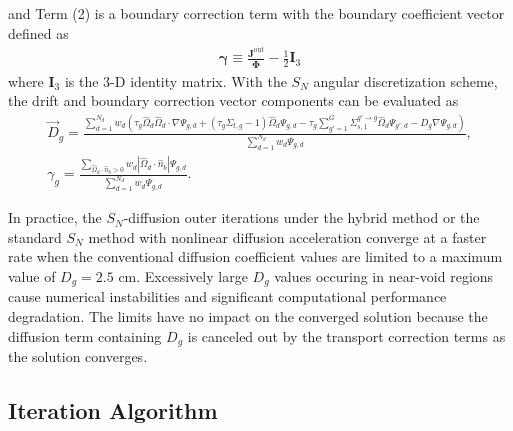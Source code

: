 %
and Term (2) is a boundary correction term with the boundary coefficient vector defined as
%
\begin{gather}
  \bm{\gamma} \equiv \frac{\bm{J}^\text{out}}{\bm{\Phi}}-\frac{1}{2}\bm{I}_3
\end{gather}
where $\bm{I}_3$ is the 3-D identity matrix.
With the $S_N$ angular discretization scheme, the drift and boundary correction vector components
can be evaluated as
%
\begin{gather}
  \vec{D}_g = \frac{\sum^{N_d}_{d=1}w_d\left(\tau_g\hat{\Omega}_d\hat{\Omega}_d\cdot\nabla\Psi_{g,d}
  + \left(\tau_g\Sigma_{t,g}-1\right)\hat{\Omega}_d\Psi_{g,d}
  - \tau_g\sum^G_{g'=1}\Sigma^{g'\rightarrow g}_{s,1}\hat{\Omega}_d\Psi_{g',d}
  - D_g\nabla\Psi_{g,d}\right)}{\sum^{N_d}_{d=1}w_d\Psi_{g,d}}, \label{eq:drift} \\
  \gamma_g =
  \frac{\sum_{\hat{\Omega}_d\cdot\hat{n}_b > 0}w_d |\hat{\Omega}_d\cdot\hat{n}_b |
  \Psi_{g,d}}{\sum^{N_d}_{d=1}w_d\Psi_{g,d}}. \label{eq:bound-coef}
\end{gather}


In practice, the $S_N$-diffusion outer iterations under the hybrid method or the standard
$S_N$ method with nonlinear diffusion acceleration converge at a faster rate when the conventional
diffusion coefficient values are limited to a maximum value of $D_g=2.5$ cm. Excessively large $D_g$ values
occuring in near-void regions cause numerical instabilities and significant computational
performance degradation. The limits have no impact on the converged solution because the diffusion term
containing $D_g$ is canceled out by the transport correction terms as the solution converges.

\subsection{Iteration Algorithm} \label{sec:hybrid-algorithm}

